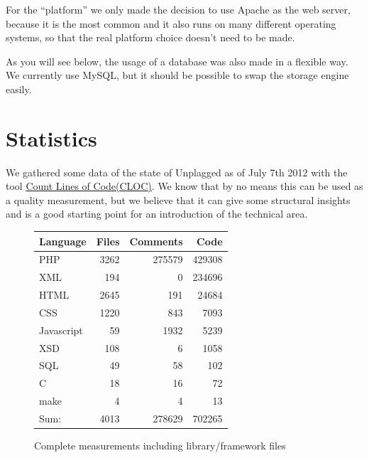 For the \enquote{platform} we only made the decision to use Apache as the web server, because it is the most common\citep{webServers} and it also runs on many different operating systems, so that the real platform choice doesn't need to be made.

As you will see below, the usage of a database was also made in a flexible way. We currently use MySQL, but it should be possible to swap the storage engine easily.

\section{Statistics}

We gathered some data of the state of Unplagged as of July 7th 2012 with the tool \href{http://cloc.sourceforge.net/}{Count Lines of Code(CLOC)}. We know that by no means this can be used as a quality measurement, but we believe that it can give some structural insights and is a good starting point for an introduction of the technical area.


\begin{figure}[!h]
  \centering
\begin{tabular}{lrrr}
\toprule
Language & Files & Comments & Code \\
\midrule
PHP & 3262 & 275579    &     429308 \\
XML & 194 & 0 & 234696 \\
HTML                     &         2645       &     191     &     24684 \\
CSS                      &         1220      &      843     &      7093 \\
Javascript                & 59       &       1932     &      5239 \\
XSD                      &           108     &         6       &    1058 \\
SQL                    &        49        &     58      &      102 \\
C                      &            18           &  16       &      72 \\
make                  &                     4      &       4    &         13 \\
\midrule
Sum: & 4013 & 278629 & 702265 \\
\bottomrule
\end{tabular}
  \caption{Complete measurements including library/framework files}
  \label{tab:completeMeasure}
\end{figure}

